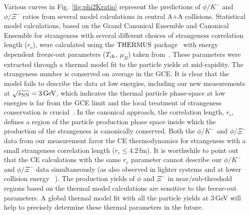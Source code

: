 \documentclass[%
 reprint,	
showpacs,
 amsmath,amssymb,
 aps,
 superscriptaddress,
]{revtex4-1}
\begin{document}
Various curves in Fig.~\ref{fig:phi2Kratio} represent the predictions of $\phi/K^-$ and $\phi/\Xi^-$ ratios from several model calculations in central A+A collisions. Statistical model calculations, based on the Grand Canonical Ensemble and Canonical Ensemble for strangeness with several different choices of strangeness correlation length ($r_c$), were calculated using the $\textup{THERMUS}$ package~\cite{THERMUS_WHEATON200984} with energy dependent freeze-out parameters ($T_{\rm ch}$, $\mu_B$) taken from~\cite{Andronic_2018Naure}. These parameters were extracted through a thermal model fit to the particle yields at mid-rapidity. The strangeness number is conserved on average in the GCE. It is clear that the model fails to describe the data at low energies, including our new measurements at ${\sqrt{s_{\rm NN}} = \rm{3\,GeV}}$, which indicates the thermal particle phase-space at low energies is far from the GCE limit and the local treatment of strangeness conservation is crucial~\cite{BraunMunzinger:2003zd}. In the canonical approach, the correlation length, $r_c$, defines a region of the particle production phase space inside which the production of the strangeness is canonically conserved. Both the $\phi/K^-$ and $\phi/\Xi^-$ data from our measurement favor the CE thermodynamics for strangeness with a small strangeness correlation length ($r_c \leq 4.2$\,fm). It is worthwhile to point out that the CE calculations with the same $r_c$ parameter cannot describe our $\phi/K^-$ and $\phi/\Xi^-$ data simultaneously (as also observed in lighter systems and at lower collision energy ~\cite{HADES_phi_ArKCl}). The production yields of $\phi$ and $\Xi^-$ in near/sub-threshold regions based on the thermal model calculations are sensitive to the freeze-out parameters. 
A global thermal model fit with all the particle yields at 3\,GeV will help to precisely determine these thermal parameters in the future.
\end{document}
